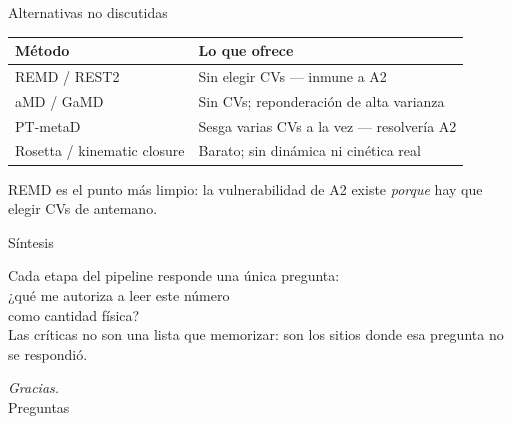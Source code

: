 \documentclass[aspectratio=169,11pt]{beamer}
\begin{document}
\begin{frame}{Alternativas no discutidas}
  \small
  \begin{center}
  \begin{tabular}{lp{5.5cm}}
    \toprule
    Método & Lo que ofrece \\
    \midrule
    REMD / REST2 & Sin elegir CVs — inmune a A2 \\
    aMD / GaMD & Sin CVs; reponderación de alta varianza \\
    PT-metaD & Sesga varias CVs a la vez — resolvería A2 \\
    Rosetta / kinematic closure & Barato; sin dinámica ni cinética real \\
    \bottomrule
  \end{tabular}
  \end{center}
  \vspace{0.5em}
  \centering \alert{REMD es el punto más limpio: la vulnerabilidad de A2 existe \emph{porque} hay que elegir CVs de antemano.}
\end{frame}

\begin{frame}{Síntesis}
  \begin{center}
    \Large
    Cada etapa del pipeline responde una única pregunta:\\[0.5em]
    \alert{¿qué me autoriza a leer este número\\como cantidad física?}\\[1em]
    \normalsize\color{migris}
    Las críticas no son una lista que memorizar: son los sitios donde esa pregunta no se respondió.
  \end{center}
\end{frame}

\begin{frame}
  \centering
  \Large\textit{Gracias.}\\[1em]
  \small\color{migris} Preguntas
\end{frame}
\end{document}
